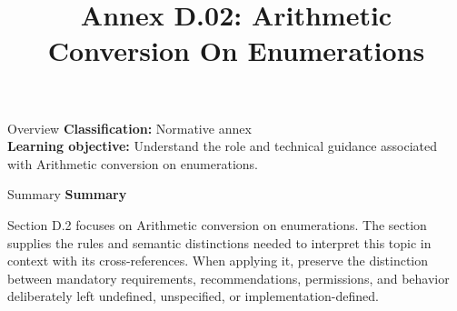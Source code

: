 \documentclass[10pt,letterpaper]{article}
\title{Annex D.02: Arithmetic Conversion On Enumerations}
\author{}
\date{}
\begin{document}
\maketitle
\begin{CornellOverviewBox}{Overview}
\textbf{Classification:} Normative annex\\[2pt]
\textbf{Learning objective:} Understand the role and technical guidance associated with Arithmetic conversion on enumerations.
\end{CornellOverviewBox}\begin{CornellSummaryBox}{Summary}
{\sffamily\bfseries\color{Accent} Summary}\par\vspace{3pt}Section D.2 focuses on Arithmetic conversion on enumerations. The section supplies the rules and semantic distinctions needed to interpret this topic in context with its cross-references. When applying it, preserve the distinction between mandatory requirements, recommendations, permissions, and behavior deliberately left undefined, unspecified, or implementation-defined.
\end{CornellSummaryBox}
\end{document}
